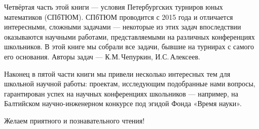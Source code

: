 \documentclass[10pt]{scrbook} \usepackage{modules/nonstahp_book}
\begin{document}
\aabz Четвёртая часть этой книги — условия Петербургских турниров юных математиков (СПбТЮМ). СПбТЮМ проводится с 2015 года и отличается интересными, сложными задачами — некоторые из этих задач впоследствии оказываются научными работами, представляемыми на различных конференциях школьников. В этой книге мы собрали все задачи, бывшие на турнирах с самого его основания. Авторы задач — К.М.\,Чепуркин, И.С.\,Алексеев.

\aabz Наконец в пятой части книги мы привели несколько интересных тем для школьной научной работы: проектам, исследующим подобранные нами вопросы, гарантирован успех на научных конференциях школьников — например, на Балтийском научно-инженерном конкурсе под эгидой Фонда «Время науки».

\aabz Желаем приятного и познавательного чтения!
\end{document}

